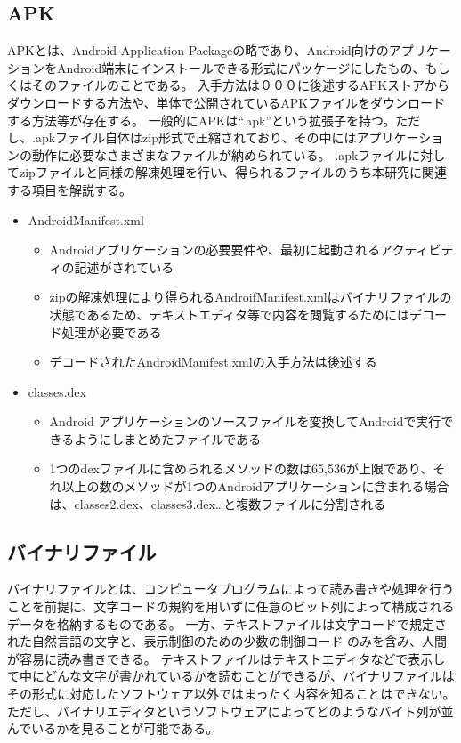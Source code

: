 \subsection{APK}
APKとは、Android Application Packageの略であり、Android向けのアプリケーションをAndroid端末にインストールできる形式にパッケージにしたもの、もしくはそのファイルのことである。
入手方法は０００に後述するAPKストアからダウンロードする方法や、単体で公開されているAPKファイルをダウンロードする方法等が存在する。
一般的にAPKは“.apk”という拡張子を持つ。ただし、.apkファイル自体はzip形式で圧縮されており、その中にはアプリケーションの動作に必要なさまざまなファイルが納められている。
.apkファイルに対してzipファイルと同様の解凍処理を行い、得られるファイルのうち本研究に関連する項目を解説する。
\begin{itemize}
	\item  AndroidManifest.xml
		\begin{itemize}
			\item Androidアプリケーションの必要要件や、最初に起動されるアクティビティの記述がされている
			\item zipの解凍処理により得られるAndroifManifest.xmlはバイナリファイルの状態であるため、テキストエディタ等で内容を閲覧するためにはデコード処理が必要である
			\item デコードされたAndroidManifest.xmlの入手方法は後述する
		\end{itemize}
	\item classes.dex
		\begin{itemize}
			\item Android アプリケーションのソースファイルを変換してAndroidで実行できるようにしまとめたファイルである
			\item 1つのdexファイルに含められるメソッドの数は65,536が上限であり、それ以上の数のメソッドが1つのAndroidアプリケーションに含まれる場合は、classes2.dex、classes3.dex…と複数ファイルに分割される
		\end{itemize}
\end{itemize}


\subsection{バイナリファイル}
バイナリファイルとは、コンピュータプログラムによって読み書きや処理を行うことを前提に、文字コードの規約を用いずに任意のビット列によって構成されるデータを格納するものである。
一方、テキストファイルは文字コードで規定された自然言語の文字と、表示制御のための少数の制御コード
のみを含み、人間が容易に読み書きできる。
テキストファイルはテキストエディタなどで表示して中にどんな文字が書かれているかを読むことができるが、バイナリファイルはその形式に対応したソフトウェア以外ではまったく内容を知ることはできない。
ただし、バイナリエディタというソフトウェアによってどのようなバイト列が並んでいるかを見ることが可能である。


